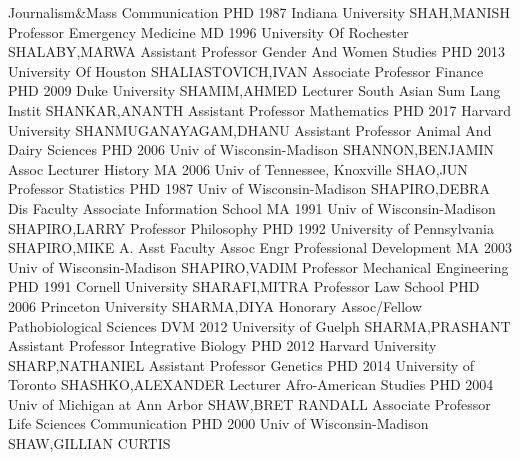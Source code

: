 \documentclass[
]{article}
\begin{document}
\textbar Journalism\&Mass Communication \textbar PHD 1987 Indiana
University \textbar{}  \textbar SHAH,MANISH
\textbar Professor \textbar Emergency Medicine \textbar MD 1996
University Of Rochester \textbar{}  \textbar SHALABY,MARWA
\textbar Assistant Professor \textbar Gender And Women Studies
\textbar PHD 2013 University Of Houston \textbar{} 
\textbar SHALIASTOVICH,IVAN \textbar Associate Professor
\textbar Finance \textbar PHD 2009 Duke University \textbar{}
 \textbar SHAMIM,AHMED \textbar Lecturer \textbar South
Asian Sum Lang Instit \textbar SHANKAR,ANANTH \textbar{} 
\textbar Assistant Professor \textbar Mathematics \textbar PHD 2017
Harvard University \textbar SHANMUGANAYAGAM,DHANU \textbar{}
 \textbar Assistant Professor \textbar Animal And Dairy
Sciences \textbar PHD 2006 Univ of Wisconsin-Madison
\textbar SHANNON,BENJAMIN \textbar{}  \textbar Assoc
Lecturer \textbar History \textbar MA 2006 Univ of Tennessee, Knoxville
\textbar SHAO,JUN \textbar{}  \textbar Professor
\textbar Statistics \textbar PHD 1987 Univ of Wisconsin-Madison
\textbar SHAPIRO,DEBRA \textbar{}  \textbar Dis Faculty
Associate \textbar Information School \textbar MA 1991 Univ of
Wisconsin-Madison \textbar SHAPIRO,LARRY \textbar{} 
\textbar Professor \textbar Philosophy \textbar PHD 1992 University of
Pennsylvania \textbar SHAPIRO,MIKE A. \textbar{} 
\textbar Asst Faculty Assoc \textbar Engr Professional Development
\textbar MA 2003 Univ of Wisconsin-Madison \textbar SHAPIRO,VADIM
\textbar{}  \textbar Professor \textbar Mechanical
Engineering \textbar PHD 1991 Cornell University \textbar SHARAFI,MITRA
\textbar{}  \textbar Professor \textbar Law School
\textbar PHD 2006 Princeton University \textbar SHARMA,DIYA \textbar{}
 \textbar Honorary Assoc/Fellow \textbar Pathobiological
Sciences \textbar DVM 2012 University of Guelph \textbar SHARMA,PRASHANT
\textbar{}  \textbar Assistant Professor
\textbar Integrative Biology \textbar PHD 2012 Harvard University
\textbar SHARP,NATHANIEL \textbar{}  \textbar Assistant
Professor \textbar Genetics \textbar PHD 2014 University of Toronto
\textbar SHASHKO,ALEXANDER \textbar{}  \textbar Lecturer
\textbar Afro-American Studies \textbar PHD 2004 Univ of Michigan at Ann
Arbor \textbar SHAW,BRET RANDALL \textbar{} 
\textbar Associate Professor \textbar Life Sciences Communication
\textbar PHD 2000 Univ of Wisconsin-Madison \textbar SHAW,GILLIAN CURTIS
\end{document}
